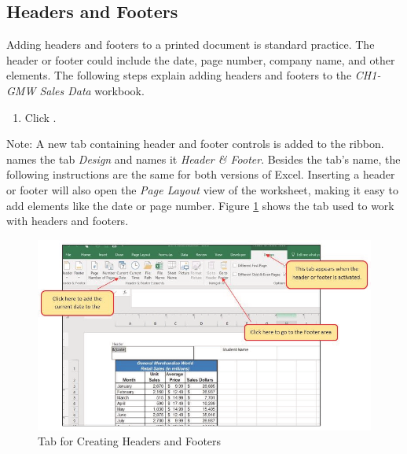 \subsection{Headers and Footers}

Adding headers and footers to a printed document is standard practice. The header or footer could include the date, page number, company name, and other elements. The following steps explain adding headers and footers to the \textit{CH1-GMW Sales Data} workbook.

\begin{enumbox}
	\begin{enumerate}
		\item Click . 
	\end{enumerate}
\end{enumbox}

Note: A new tab containing header and footer controls is added to the ribbon.  names the tab \textit{Design} and  names it \textit{Header \& Footer}. Besides the tab's name, the following instructions are the same for both versions of Excel. Inserting a header or footer will also open the \textit{Page Layout} view of the worksheet, making it easy to add elements like the date or page number. Figure \ref{01:fig50} shows the tab used to work with headers and footers.

\begin{figure}[H]
	\centering
	\includegraphics[width=\maxwidth{.95\linewidth}]{gfx/ch01_fig50}
	\caption{Tab for Creating Headers and Footers}
	\label{01:fig50}
\end{figure}

